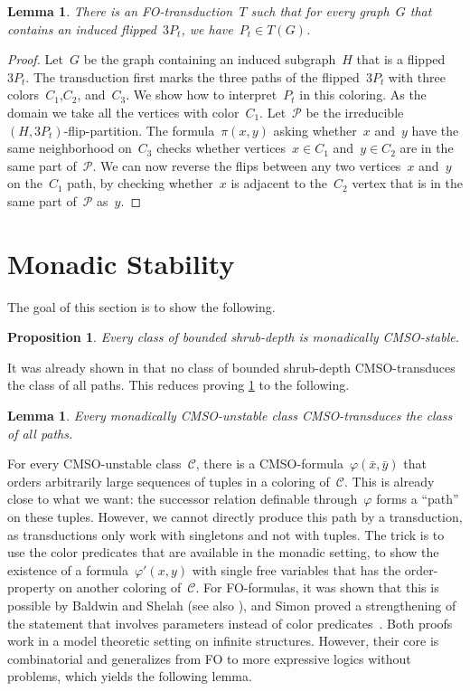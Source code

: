 \documentclass[11pt]{article}      \usepackage[margin=1in]{geometry}  \usepackage{microtype}
\newtheorem{lemma}[theorem]{Lemma}
\newtheorem{proposition}[theorem]{Proposition}
\theoremstyle{definition}
\renewcommand{\phi}{\varphi}
\newcommand{\CC}{\mathcal{C}}
\newcommand{\PP}{\mathcal{P}}
\begin{document}
\begin{lemma}
\label{prop:3ptToPaths}
There is an FO-transduction~$T$ such that for every graph~$G$ that contains an induced flipped~$3P_t$, we have~$P_t \in T(G)$.
\end{lemma}

\begin{proof}
    Let~$G$ be the graph containing an induced subgraph~$H$ that is a flipped~$3P_t$.
    The transduction first marks the three paths of the flipped~$3P_t$ with three colors~$C_1$,$C_2$, and~$C_3$.
    We show how to interpret~$P_t$ in this coloring.
    As the domain we take all the vertices with color~$C_1$.
    Let~$\PP$ be the irreducible~$(H,3P_t)$-flip-partition.
    The formula~$\pi(x,y)$ asking whether~$x$ and~$y$ have the same neighborhood on~$C_3$ checks whether vertices~$x \in C_1$ and~$y\in C_2$ are in the same part of~$\PP$.
    We can now reverse the flips between any two vertices~$x$ and~$y$ on the~$C_1$ path, by checking whether~$x$ is adjacent to the~$C_2$ vertex that is in the same part of~$\PP$ as~$y$.
\end{proof} 
\section{Monadic Stability}\label{sec:mstable}
The goal of this section is to show the following.

\begin{proposition}\label{prop:sd-implies-mcmso-stable}
    Every class of bounded shrub-depth is monadically CMSO-stable.
\end{proposition}

It was already shown in \cite{shrubdepth-journal} that no class of bounded shrub-depth CMSO-transduces the class of all paths.
This reduces proving \cref{prop:sd-implies-mcmso-stable} to the following.

\begin{lemma}\label{prop:cmso-transductions}
    Every monadically CMSO-unstable class CMSO-transduces the class of all paths.
\end{lemma}


For every CMSO-unstable class~$\CC$, there is a CMSO-formula~$\phi(\bar x, \bar y)$ that orders arbitrarily large sequences of tuples in a coloring of~$\CC$.
This is already close to what we want: the successor relation definable through~$\phi$ forms a ``path'' on these tuples.
However, we cannot directly produce this path by a transduction, as transductions only work with singletons and not with tuples.
The trick is to use the color predicates that are available in the monadic setting, to show the existence of a formula~$\phi'(x,y)$ with single free variables that has the order-property on another coloring of~$\CC$.
For FO-formulas, it was shown that this is possible by Baldwin and Shelah \cite[Lem.\ 8.1.3]{baldwin1985second} (see also \mbox{\cite[Thm.\ 2.2]{anderson1990tree}}), and Simon proved a strengthening of the statement that involves parameters instead of color predicates~\cite{simon2021note}.
Both proofs work in a model theoretic setting on infinite structures.
However, their core is combinatorial and generalizes from FO to more expressive logics without problems, which yields the following lemma.
\end{document}
